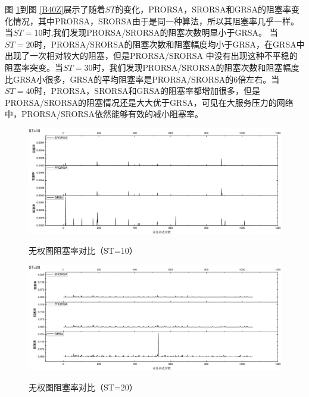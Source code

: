 图 \ref{B10Z}到图 \ref{B40Z}展示了随着$ST$的变化，PRORSA，SRORSA和GRSA的阻塞率变化情况，其中PRORSA，SRORSA由于是同一种算法，所以其阻塞率几乎一样。当$ST=10$时,我们发现PRORSA/SRORSA的阻塞次数明显小于GRSA。 当$ST=20$时，PRORSA/SRORSA的阻塞次数和阻塞幅度均小于GRSA，在GRSA中出现了一次相对较大的阻塞，但是PRORSA/SRORSA 中没有出现这种不平稳的阻塞率突变。当$ST=30$时，我们发现PRORSA/SRORSA的阻塞次数和阻塞幅度比GRSA小很多，GRSA的平均阻塞率是PRORSA/SRORSA的6倍左右。当$ST=40$时，PRORSA，SRORSA和GRSA的阻塞率都增加很多，但是PRORSA/SRORSA的阻塞情况还是大大优于GRSA，可见在大服务压力的网络中，PRORSA/SRORSA依然能够有效的减小阻塞率。
\begin{figure}
\setlength{\belowcaptionskip}{-0.5cm}
\begin{center}
{\includegraphics[width=1 \textwidth]{figures/B10Z.pdf}}
\end{center}
\caption{{\footnotesize{无权图阻塞率对比（ST=10）}}}
\label{B10Z}
\end{figure}
\begin{figure}
\setlength{\belowcaptionskip}{-0.5cm}
\begin{center}
{\includegraphics[width=1 \textwidth]{figures/B20Z.pdf}}
\end{center}
\caption{{\footnotesize{无权图阻塞率对比（ST=20）}}}
\label{B20Z}
\end{figure}
